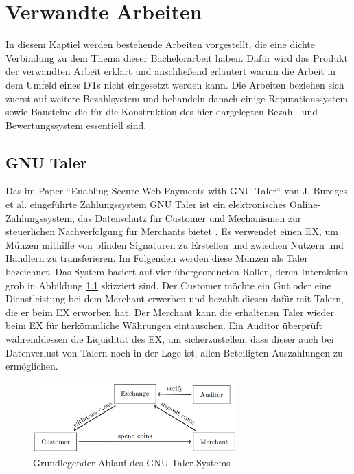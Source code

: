 \documentclass[
	fontsize=11pt,
	headings=small,
	parskip=half,           %
	bibliography=totoc,
	numbers=noenddot,       %
	open=any,               %
]{scrreprt}
\begin{document}
\chapter{Verwandte Arbeiten}
In diesem Kaptiel werden bestehende Arbeiten vorgestellt, die eine dichte Verbindung zu dem Thema dieser Bachelorarbeit haben. Dafür wird das Produkt der verwandten Arbeit erklärt und anschließend erläutert warum die Arbeit in dem Umfeld eines DTs nicht eingesetzt werden kann. Die Arbeiten beziehen sich zuerst auf weitere Bezahlsystem und behandeln danach einige Reputationssystem sowie Bausteine die für die Konstruktion des hier dargelegten Bezahl- und Bewertungssystem essentiell sind.

\section{GNU Taler}
\label{subsec:gnu}
Das im Paper ``Enabling Secure Web Payments with GNU Taler`` von J. Burdges et al. eingeführte Zahlungssystem GNU Taler ist ein elektronisches Online-Zahlungssystem, das Datenschutz für Customer und Mechanismen zur steuerlichen Nachverfolgung für Merchants bietet \cite{gnu-burdges2016enabling}. Es verwendet einen EX, um Münzen mithilfe von blinden Signaturen zu Erstellen und zwischen Nutzern und Händlern zu transferieren. Im Folgenden werden diese Münzen als Taler bezeichnet. Das System basiert auf vier übergeordneten Rollen, deren Interaktion grob in Abbildung \ref{fig:gnu_taler_overview} skizziert sind. Der Customer möchte ein Gut oder eine Dienstleistung bei dem Merchant erwerben und bezahlt diesen dafür mit Talern, die er beim EX erworben hat. Der Merchant kann die erhaltenen Taler wieder beim EX für herkömmliche Währungen eintauschen. Ein Auditor überprüft währenddessen die Liquidität des EX, um sicherzustellen, dass dieser auch bei Datenverlust von Talern noch in der Lage ist, allen Beteiligten Auszahlungen zu ermöglichen.

\begin{figure}[H]
    \centering
    \includegraphics[width=0.7\textwidth]{gnu_system_graphic.png}
    \caption{Grundlegender Ablauf des GNU Taler Systems \cite{gnu-burdges2016enabling}}
    \label{fig:gnu_taler_overview}
\end{figure}
\end{document}
